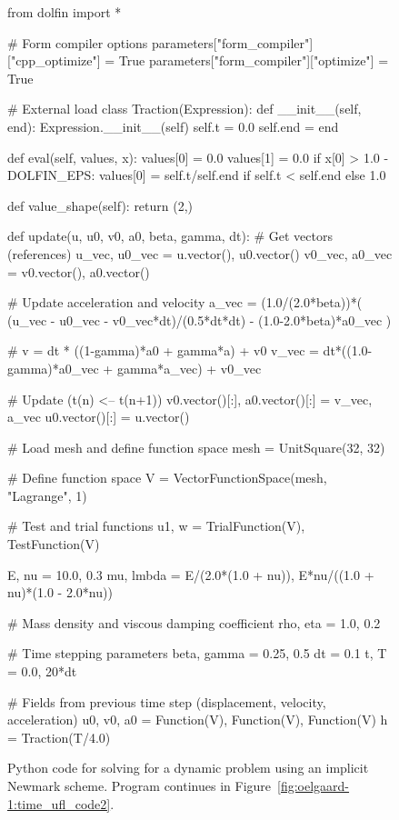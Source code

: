 \begin{figure}
\bwfig
\begin{python}
from dolfin import *

# Form compiler options
parameters["form_compiler"]["cpp_optimize"] = True
parameters["form_compiler"]["optimize"] = True

# External load
class Traction(Expression):
    def __init__(self, end):
        Expression.__init__(self)
        self.t = 0.0
        self.end = end

    def eval(self, values, x):
        values[0] = 0.0
        values[1] = 0.0
        if x[0] > 1.0 - DOLFIN_EPS:
            values[0] = self.t/self.end if self.t < self.end else 1.0

    def value_shape(self):
        return (2,)

def update(u, u0, v0, a0, beta, gamma, dt):
    # Get vectors (references)
    u_vec, u0_vec  = u.vector(), u0.vector()
    v0_vec, a0_vec = v0.vector(), a0.vector()

    # Update acceleration and velocity
    a_vec = (1.0/(2.0*beta))*( (u_vec - u0_vec - v0_vec*dt)/(0.5*dt*dt) - (1.0-2.0*beta)*a0_vec )

    # v = dt * ((1-gamma)*a0 + gamma*a) + v0
    v_vec = dt*((1.0-gamma)*a0_vec + gamma*a_vec) + v0_vec

    # Update (t(n) <-- t(n+1))
    v0.vector()[:], a0.vector()[:] = v_vec, a_vec
    u0.vector()[:] = u.vector()

# Load mesh and define function space
mesh = UnitSquare(32, 32)

# Define function space
V = VectorFunctionSpace(mesh, "Lagrange", 1)

# Test and trial functions
u1, w = TrialFunction(V), TestFunction(V)

E, nu  = 10.0, 0.3
mu, lmbda = E/(2.0*(1.0 + nu)), E*nu/((1.0 + nu)*(1.0 - 2.0*nu))

# Mass density and viscous damping coefficient
rho, eta = 1.0, 0.2

# Time stepping parameters
beta, gamma = 0.25, 0.5
dt   = 0.1
t, T = 0.0, 20*dt

# Fields from previous time step (displacement, velocity, acceleration)
u0, v0, a0 = Function(V), Function(V), Function(V)
h = Traction(T/4.0)
\end{python}
\caption{Python code for solving for a dynamic
problem using an implicit Newmark scheme. Program continues in
Figure~\ref{fig:oelgaard-1:time_ufl_code2}.}
\label{fig:oelgaard-1:time_ufl_code}
\end{figure}

